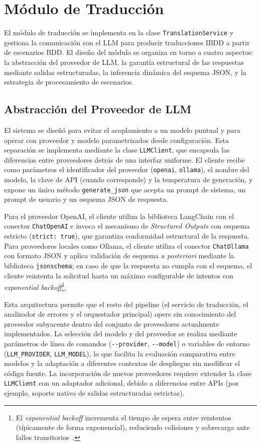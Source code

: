 \section{Módulo de Traducción}
\label{sec:modulo-traduccion}

El módulo de traducción se implementa en la clase \texttt{TranslationService} y gestiona la comunicación con el LLM para producir traducciones IBDD a partir de escenarios BDD. El diseño del módulo se organiza en torno a cuatro aspectos: la abstracción del proveedor de LLM, la garantía estructural de las respuestas mediante salidas estructuradas, la inferencia dinámica del esquema JSON, y la estrategia de procesamiento de escenarios.

\subsection{Abstracción del Proveedor de LLM}

El sistema se diseñó para evitar el acoplamiento a un modelo puntual y para operar con proveedor y modelo parametrizados desde configuración. Esta separación se implementa mediante la clase \texttt{LLMClient}, que encapsula las diferencias entre proveedores detrás de una interfaz uniforme. El cliente recibe como parámetros el identificador del proveedor (\texttt{openai}, \texttt{ollama}), el nombre del modelo, la clave de API (cuando corresponde) y la temperatura de generación, y expone un único método \texttt{generate\_json} que acepta un prompt de sistema, un prompt de usuario y un esquema JSON de respuesta.

Para el proveedor OpenAI, el cliente utiliza la biblioteca LangChain con el conector \texttt{ChatOpenAI} e invoca el mecanismo de \textit{Structured Outputs} con esquema estricto (\texttt{strict:~true}), que garantiza conformidad estructural de la respuesta. Para proveedores locales como Ollama, el cliente utiliza el conector \texttt{ChatOllama} con formato JSON y aplica validación de esquema \textit{a posteriori} mediante la biblioteca \texttt{jsonschema}; en caso de que la respuesta no cumpla con el esquema, el cliente reintenta la solicitud hasta un máximo configurable de intentos con \textit{exponential backoff}\footnote{El \textit{exponential backoff} incrementa el tiempo de espera entre reintentos (típicamente de forma exponencial), reduciendo colisiones y sobrecarga ante fallos transitorios~\cite{metcalfe1976ethernet}.}.

Esta arquitectura permite que el resto del pipeline (el servicio de traducción, el analizador de errores y el orquestador principal) opere sin conocimiento del proveedor subyacente dentro del conjunto de proveedores actualmente implementados. La selección del modelo y del proveedor se realiza mediante parámetros de línea de comandos (\texttt{-{}-provider}, \texttt{-{}-model}) o variables de entorno (\texttt{LLM\_PROVIDER}, \texttt{LLM\_MODEL}), lo que facilita la evaluación comparativa entre modelos y la adaptación a diferentes contextos de despliegue sin modificar el código fuente. La incorporación de nuevos proveedores requiere extender la clase \texttt{LLMClient} con un adaptador adicional, debido a diferencias entre APIs (por ejemplo, soporte nativo de salidas estructuradas estrictas).

